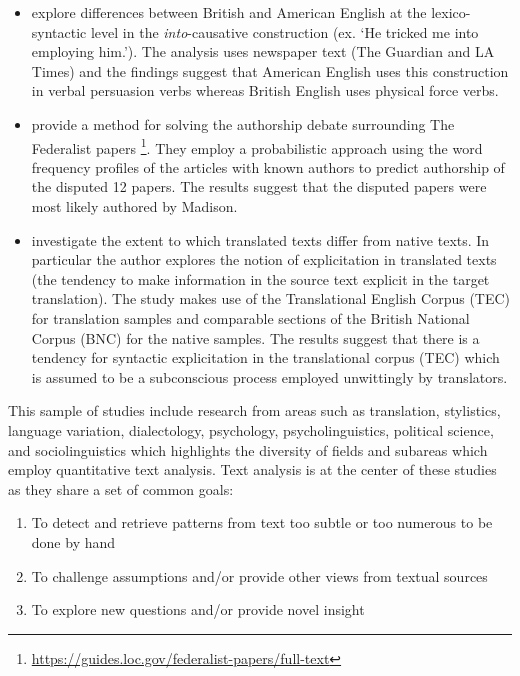\documentclass[
]{article}
\providecommand{\tightlist}{%
  \setlength{\itemsep}{0pt}\setlength{\parskip}{0pt}}
\newenvironment{rmdblock}[1]
  {\begin{shaded*}
  \begin{itemize}
  \renewcommand{\labelitemi}{
    \raisebox{-.5\height}[0pt][0pt]{
      {\setkeys{Gin}{width=2em,keepaspectratio}\texttt{[image: assets/images/\#1]}}
    }
  }
  \item
  }
  {
  \end{itemize}
  \end{shaded*}
  }
\newenvironment{rmdstudy}
  {\begin{rmdblock}{paper}}
  {\end{rmdblock}}
\begin{document}
\begin{rmdstudy}
\citet{Wulff2007} explore differences between British and American English at the lexico-syntactic level in the \emph{into}-causative construction (ex. `He tricked me into employing him.'). The analysis uses newspaper text (The Guardian and LA Times) and the findings suggest that American English uses this construction in verbal persuasion verbs whereas British English uses physical force verbs.
\end{rmdstudy}

\begin{rmdstudy}
\citet{Mosteller1963} provide a method for solving the authorship debate surrounding The Federalist papers \footnote{\url{https://guides.loc.gov/federalist-papers/full-text}}. They employ a probabilistic approach using the word frequency profiles of the articles with known authors to predict authorship of the disputed 12 papers. The results suggest that the disputed papers were most likely authored by Madison.
\end{rmdstudy}

\begin{rmdstudy}
\citet{Olohan2008} investigate the extent to which translated texts differ from native texts. In particular the author explores the notion of explicitation in translated texts (the tendency to make information in the source text explicit in the target translation). The study makes use of the Translational English Corpus (TEC) for translation samples and comparable sections of the British National Corpus (BNC) for the native samples. The results suggest that there is a tendency for syntactic explicitation in the translational corpus (TEC) which is assumed to be a subconscious process employed unwittingly by translators.
\end{rmdstudy}

This sample of studies include research from areas such as translation, stylistics, language variation, dialectology, psychology, psycholinguistics, political science, and sociolinguistics which highlights the diversity of fields and subareas which employ quantitative text analysis. Text analysis is at the center of these studies as they share a set of common goals:

\begin{enumerate}
\def\labelenumi{\arabic{enumi}.}
\tightlist
\item
  To detect and retrieve patterns from text too subtle or too numerous to be done by hand
\item
  To challenge assumptions and/or provide other views from textual sources
\item
  To explore new questions and/or provide novel insight
\end{enumerate}
\end{document}
